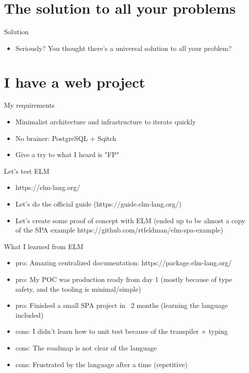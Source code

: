 \documentclass[10pt]{beamer}
\begin{document}
\section{The solution to all your problems}

\begin{frame}{Solution}
\begin{itemize}
\item Seriously? You thought there's a universal solution to all your problem?
\end{itemize}
\end{frame}

\section{I have a web project}

\begin{frame}{My requirements}
\begin{itemize}
\item Minimalist architecture and infrastructure to iterate quickly
\item No brainer: PostgreSQL + Sqitch
\item Give a try to what I heard is "FP"
\end{itemize}
\end{frame}

\begin{frame}{Let's test ELM}
\begin{itemize}
\item https://elm-lang.org/
\item Let's do the official guide (https://guide.elm-lang.org/)
\item Let's create some proof of concept with ELM (ended up to be almost a copy of the SPA example https://github.com/rtfeldman/elm-spa-example)
\end{itemize}
\end{frame}

\begin{frame}{What I learned from ELM}
\begin{itemize}
\item pro: Amazing centralized documentation: https://package.elm-lang.org/
\item pro: My POC was production ready from day 1 (mostly because of type safety, and the tooling is minimal/simple)
\item pro: Finished a small SPA project in ~2 months (learning the language included)
\item cons: I didn't learn how to unit test because of the transpiler + typing
\item cons: The roadmap is not clear of the language
\item cons: Frustrated by the language after a time (repetitive)
\end{itemize}
\end{frame}
\end{document}
